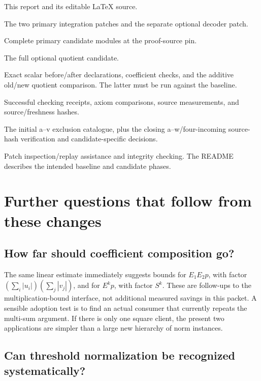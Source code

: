\documentclass[11pt]{article}
\newcommand{\code}[1]{\ifmmode\text{\ttfamily\detokenize{#1}}\else\nolinkurl{#1}\fi}
\begin{document}
\begin{description}[style=nextline,leftmargin=1em,labelindent=0pt]
\item[\code{report.tex} and \code{report.pdf}]
This report and its editable LaTeX source.
\item[\code{patches/}]
The two primary integration patches and the separate optional decoder patch.
\item[\code{overlay/}]
Complete primary candidate modules at the proof-source pin.
\item[\code{optional/}]
The full optional quotient candidate.
\item[\code{checks/}]
Exact scalar before/after declarations, coefficient checks, and the additive
old/new quotient comparison. The latter must be run against the baseline.
\item[\code{evidence/}]
Successful checking receipts, axiom comparisons, source measurements, and
source/freshness hashes.
\item[\code{audit/}]
The initial a--v exclusion catalogue, plus the closing a--w/four-incoming
source-hash verification and candidate-specific decisions.
\item[\code{scripts/}]
Patch inspection/replay assistance and integrity checking. The README describes
the intended baseline and candidate phases.
\end{description}

\section{Further questions that follow from these changes}

\subsection{How far should coefficient composition go?}

The same linear estimate immediately suggests bounds for
\(E_1E_2p\), with factor
\((\sum_i|u_i|)(\sum_j|v_j|)\), and for \(E^kp\), with factor \(S^k\).
These are follow-ups to the multiplication-bound interface, not additional measured
savings in this packet. A sensible adoption test is to find an actual consumer that
currently repeats the multi-sum argument. If there is only one square client, the
present two applications are simpler than a large new hierarchy of norm instances.

\subsection{Can threshold normalization be recognized systematically?}
\end{document}
